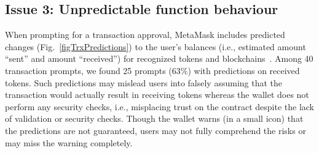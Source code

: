 \documentclass[conference]{IEEEtran}
\begin{document}

\subsection{Issue 3: Unpredictable function behaviour}
\label{sec:results:contracts}
When prompting for a transaction approval, MetaMask includes predicted changes (Fig.~\ref{figTrxPredictions}) to the user's balances (i.e., estimated amount ``sent'' and amount ``received'') for recognized tokens and blockchains~\cite{metamaskEstimatedChanges}.
Among 40 transaction prompts, we found 25 prompts (63\%) with predictions on received tokens.
Such predictions may mislead users into falsely assuming that the transaction would actually result in receiving tokens whereas the wallet does not perform any security checks, i.e., misplacing trust on the contract despite the lack of validation or security checks.
Though the wallet warns (in a small icon) that the predictions are not guaranteed, users may not fully comprehend the risks or may miss the warning completely.
\end{document}
